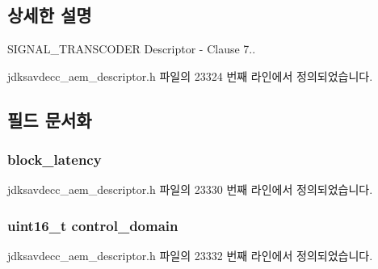 \subsection{상세한 설명}
S\+I\+G\+N\+A\+L\+\_\+\+T\+R\+A\+N\+S\+C\+O\+D\+ER Descriptor -\/ Clause 7.. 

jdksavdecc\+\_\+aem\+\_\+descriptor.\+h 파일의 23324 번째 라인에서 정의되었습니다.



\subsection{필드 문서화}
\subsubsection[{\texorpdfstring{block\+\_\+latency}{block_latency}}]{ block\+\_\+latency}\hypertarget{structjdksavdecc__descriptor__signal__transcoder_ae2e9f0088d5e900b610d1b2818dfc559}{}\label{structjdksavdecc__descriptor__signal__transcoder_ae2e9f0088d5e900b610d1b2818dfc559}


jdksavdecc\+\_\+aem\+\_\+descriptor.\+h 파일의 23330 번째 라인에서 정의되었습니다.

\subsubsection[{\texorpdfstring{control\+\_\+domain}{control_domain}}]{\setlength{\rightskip}{0pt plus 5cm}uint16\+\_\+t control\+\_\+domain}\hypertarget{structjdksavdecc__descriptor__signal__transcoder_a8937b22996b7c28ae209f29fe777f03a}{}\label{structjdksavdecc__descriptor__signal__transcoder_a8937b22996b7c28ae209f29fe777f03a}


jdksavdecc\+\_\+aem\+\_\+descriptor.\+h 파일의 23332 번째 라인에서 정의되었습니다.

